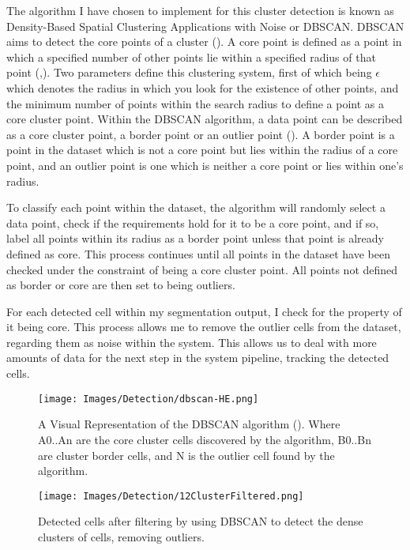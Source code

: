 \documentclass[12pt a4paper]{article}
\begin{document}
The algorithm I have chosen to implement for this cluster detection is known as Density-Based Spatial Clustering Applications with Noise or DBSCAN. DBSCAN aims to detect the core points of a cluster (\cite{ester1996density}). A core point is defined as a point in which a specified number of other points lie within a specified radius of that point (\cite{borah2004improved},\cite{ester1996density}). Two parameters define this clustering system, first of which being $\epsilon$ which denotes the radius in which you look for the existence of other points, and the minimum number of points within the search radius to define a point as a core cluster point. Within the DBSCAN algorithm, a data point can be described as a core cluster point, a border point or an outlier point (\cite{borah2004improved}). A border point is a point in the dataset which is not a core point but lies within the radius of a core point, and an outlier point is one which is neither a core point or lies within one's radius.

To classify each point within the dataset, the algorithm will randomly select a data point, check if the requirements hold for it to be a core point, and if so, label all points within its radius as a border point unless that point is already defined as core. This process continues until all points in the dataset have been checked under the constraint of being a core cluster point. All points not defined as border or core are then set to being outliers.

For each detected cell within my segmentation output, I check for the property of it being core. This process allows me to remove the outlier cells from the dataset, regarding them as noise within the system. This allows us to deal with more amounts of data for the next step in the system pipeline, tracking the detected cells.

\begin{figure}
    \centering
    \texttt{[image: Images/Detection/dbscan-HE.png]}
    \caption{A Visual Representation of the DBSCAN algorithm (\cite{He2014}). Where A0..An are the core cluster cells discovered by the algorithm, B0..Bn are cluster border cells, and N is the outlier cell found by the algorithm.}
    \label{fig:heDBSCAN}
\end{figure}
\begin{figure}
    \centering
    \texttt{[image: Images/Detection/12ClusterFiltered.png]}
    \caption{Detected cells after filtering by using DBSCAN to detect the dense clusters of cells, removing outliers.}
    \label{fig:my_label}
\end{figure}
\end{document}
